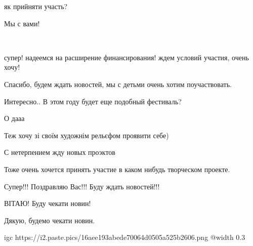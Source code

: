 
як прийняти участь?


Мы с вами!


💖


супер! надеемся на расширение финансирования! ждем условий участия, очень хочу!


Спасибо, будем ждать новостей, мы с детьми очень хотим поучаствовать.


Интересно.. В этом году будет еще подобный фестиваль?


О дааа


Теж хочу зі своїм художнім рельєфом проявити себе)


С нетерпением жду новых проэктов 🙂


Тоже очень хочется принять участие в каком нибудь творческом проекте.


Супер!!! Поздравляю Вас!!! Буду ждать новостей!!!


ВІТАЮ! Буду чекати новин!


Дякую, будемо чекати новин.


\ifcmt
  igc https://i2.paste.pics/16aee193abede70064d0505a525b2606.png
	@width 0.3
\fi

